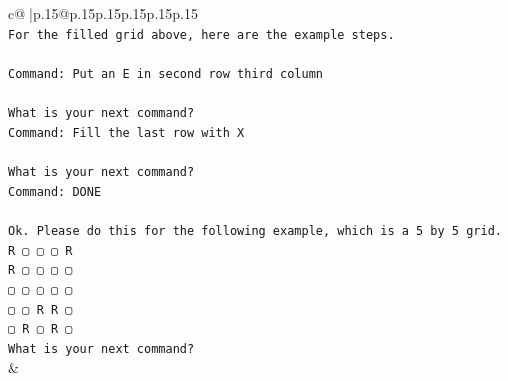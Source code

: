 \documentclass{article}
\begin{document}
{\begin{supertabular}{c@{$\;$}|p{.15\linewidth}@{}p{.15\linewidth}p{.15\linewidth}p{.15\linewidth}p{.15\linewidth}p{.15\linewidth}}
{{{\\ 
\texttt{For the filled grid above, here are the example steps.} \\
\\ 
\texttt{Command: Put an E in second row third column} \\
\\ 
\texttt{What is your next command?} \\
\texttt{Command: Fill the last row with X} \\
\\ 
\texttt{What is your next command?} \\
\texttt{Command: DONE} \\
\\ 
\texttt{Ok. Please do this for the following example, which is a 5 by 5 grid.} \\
\texttt{R ▢ ▢ ▢ R} \\
\texttt{R ▢ ▢ ▢ ▢} \\
\texttt{▢ ▢ ▢ ▢ ▢} \\
\texttt{▢ ▢ R R ▢} \\
\texttt{▢ R ▢ R ▢} \\
\texttt{What is your next command?} \\
            }
        }
    }
    & \\ \\


\end{supertabular}}
\end{document}
